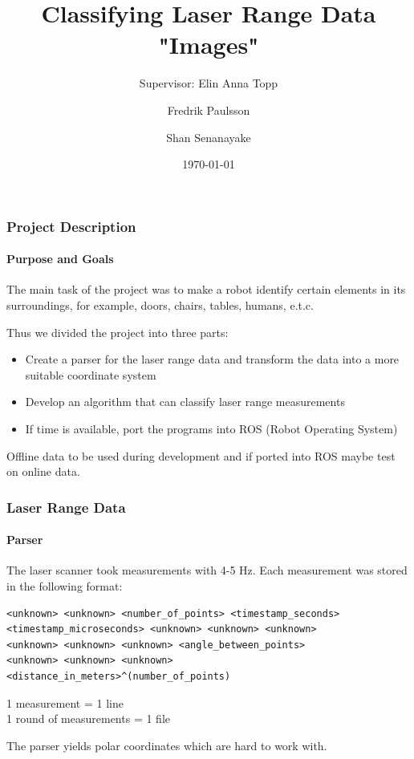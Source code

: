 \documentclass{beamer}
\title[Classifying Laser Range Data "Images"] %
{Classifying Laser Range Data "Images"}
\subtitle{Supervisor: Elin Anna Topp}
\author[F. Paulsson, S. Senanayake]%
{Fredrik Paulsson \and Shan Senanayake}
\institute[LTH] %
{Lund University \\ Faculty of Engineering}
\date[\today] %
{\today}
\begin{document}
\frame{\titlepage}

\begin{frame}[shrink]
\frametitle{Project Description}
\framesubtitle{Purpose and Goals}

\begin{figure}
\vspace{-35pt}
  \begin{center}
  \end{center}
\end{figure}

The main task of the project was to make a robot identify certain elements in its surroundings, for example, doors, chairs, tables, humans, e.t.c.

\vspace{10pt}

Thus we divided the project into three parts:

\begin{itemize}
\pause
\item{Create a parser for the laser range data and transform the data into a more suitable coordinate system}
\pause  
\item{Develop an algorithm that can classify laser range measurements}
\pause  
\item{If time is available, port the programs into ROS (Robot Operating System)}
\end{itemize}
\pause
Offline data to be used during development and if ported into ROS maybe test on online data.

\end{frame}

\begin{frame}[fragile]
\frametitle{Laser Range Data}
\framesubtitle{Parser}

The laser scanner took measurements with 4-5 Hz. Each measurement was stored in the following format:
\begin{verbatim}
<unknown> <unknown> <number_of_points> <timestamp_seconds>
<timestamp_microseconds> <unknown> <unknown> <unknown>
<unknown> <unknown> <unknown> <angle_between_points>
<unknown> <unknown> <unknown>
<distance_in_meters>^(number_of_points)
\end{verbatim}

1 measurement = 1 line
\\
1 round of measurements = 1 file

\pause
\vspace{10pt}

The parser yields polar coordinates which are hard to work with.

\end{frame}
\end{document}
